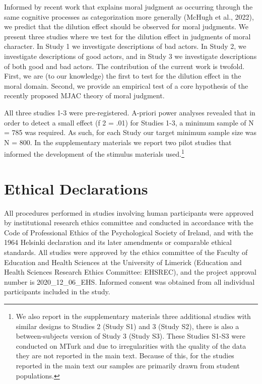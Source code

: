 \documentclass[
  man,floatsintext]{apa6}
\begin{document}
Informed by recent work that explains moral judgment as occurring through the same cognitive processes as categorization more generally (McHugh et al., 2022), we predict that the dilution effect should be observed for moral judgments. We present three studies where we test for the dilution effect in judgments of moral character. In Study 1 we investigate descriptions of bad actors. In Study 2, we investigate descriptions of good actors, and in Study 3 we investigate descriptions of both good and bad actors. The contribution of the current work is twofold. First, we are (to our knowledge) the first to test for the dilution effect in the moral domain. Second, we provide an empirical test of a core hypothesis of the recently proposed MJAC theory of moral judgment.

All three studies 1-3 were pre-registered. A-priori power analyses revealed that in order to detect a small effect (f 2 = .01) for Studies 1-3, a minimum sample of N = 785 was required. As such, for each Study our target minimum sample size was N = 800. In the supplementary materials we report two pilot studies that informed the development of the stimulus materials used.\footnote{We also report in the supplementary materials three additional studies with similar designs to Studies 2 (Study S1) and 3 (Study S2), there is also a between-subjects version of Study 3 (Study S3). These Studies S1-S3 were conducted on MTurk and due to irregularities with the quality of the data they are not reported in the main text. Because of this, for the studies reported in the main text our samples are primarily drawn from student populations.}

\section{Ethical Declarations}\label{ethical-declarations}

All procedures performed in studies involving human participants were approved by institutional research ethics committee and conducted in accordance with the Code of Professional Ethics of the Psychological Society of Ireland, and with the 1964 Helsinki declaration and its later amendments or comparable ethical standards. All studies were approved by the ethics committee of the Faculty of Education and Health Sciences at the University of Limerick (Education and Health Sciences Research Ethics Committee: EHSREC), and the project approval number is 2020\_12\_06\_EHS. Informed consent was obtained from all individual participants included in the study.
\end{document}
